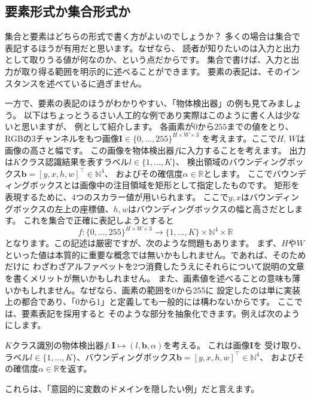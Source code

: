 \documentclass[uplatex,twocolumn,9pt,dvipdfmx]{jsarticle}
\begin{document}
\subsection{要素形式か集合形式か}

集合と要素はどちらの形式で書く方がよいのでしょうか？
多くの場合は集合で表記するほうが有用だと思います。なぜなら、
読者が知りたいのは入力と出力として取りうる値が何なのか、という点だからです。
集合で書けば、入力と出力が取り得る範囲を明示的に述べることができます。
要素の表記は、そのインスタンスを述べているに過ぎません。

一方で、要素の表記のほうがわかりやすい、「物体検出器」の例も見てみましょう。
以下はちょっとうるさい人工的な例であり実際はこのように書く人は少ないと思いますが、
例として紹介します。
各画素が$0$から$255$までの値をとり、
RGBの3チャンネルをもつ画像$\mathbf{I} \in \{0, \dots, 255\}^{H \times W \times 3}$
を考えます。ここで$H$, $W$は画像の高さと幅です。
この画像を物体検出器$f$に入力することを考えます。
出力は$K$クラス認識結果を表すラベル$l \in \{1, \dots, K\}$、
検出領域のバウンディングボックス$\mathbf{b} = [y, x, h, w]^\top \in \mathbb{N}^4$、
およびその確信度$\alpha \in \mathbb{R}$とします。
ここでバウンディングボックスとは画像中の注目領域を矩形として指定したものです。
矩形を表現するために、4つのスカラー値が用いられます。
ここで$y, x$はバウンディングボックスの左上の座標値、$h, w$はバウンディングボックスの幅と高さだとします。
これを集合で正確に表記しようとすると
\begin{equation}
    f: \{0, \dots, 255\}^{H \times W \times 3} \to \{1, \dots, K\} \times \mathbb{N}^4 \times \mathbb{R} 
\end{equation}
となります。この記述は厳密ですが、次のような問題もあります。
まず、$H$や$W$といった値は本質的に重要な概念では無いかもしれません。であれば、そのためだけに
わざわざアルファベットを2つ消費したうえにそれらについて説明の文章を書くメリットが無いかもしれません。
また、画素値を述べることの意味も薄いかもしれません。なぜなら、画素の範囲を0から255に
設定したのは単に実装上の都合であり、「0から1」と定義しても一般的には構わないからです。
ここでは、要素表記を採用すると
そのような部分を抽象化できます。例えば次のようにします。
\begin{screen}
$K$クラス識別の物体検出器$f: \mathbf{I} \mapsto (l, \mathbf{b}, \alpha)$を考える。
これは画像$\mathbf{I}$を
受け取り、ラベル$l \in \{1, \dots, K\}$、バウンディングボックス$\mathbf{b} = [y, x, h, w]^\top \in \mathbb{N}^4$、
およびその確信度$\alpha \in \mathbb{R}$を返す。
\end{screen}
これらは、「意図的に変数のドメインを隠したい例」だと言えます。
\end{document}
